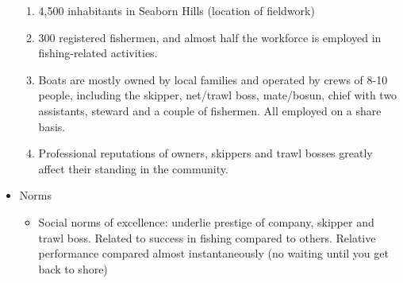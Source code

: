 \documentclass[a4paper,10pt]{article}
\begin{document}
\begin{itemize}
\begin{enumerate}
	\item 4,500 inhabitants in Seaborn Hills (location of fieldwork)
	\item 300 registered fishermen, and almost half the workforce is employed in fishing-related activities.
	\item Boats are mostly owned by local families and operated by crews of 8-10 people, including the skipper, net/trawl boss, mate/bosun, chief with two assistants, steward and a couple of fishermen. All employed on a share basis.
	\item Professional reputations of owners, skippers and trawl bosses greatly affect their standing in the community.
\end{enumerate}
\item Norms
\begin{itemize}
\item Social norms of excellence: underlie prestige of company, skipper and trawl boss. Related to success in fishing compared to others. Relative performance compared almost instantaneously (no waiting until you get back to shore)
\end{itemize}
\end{itemize}



\end{document}
